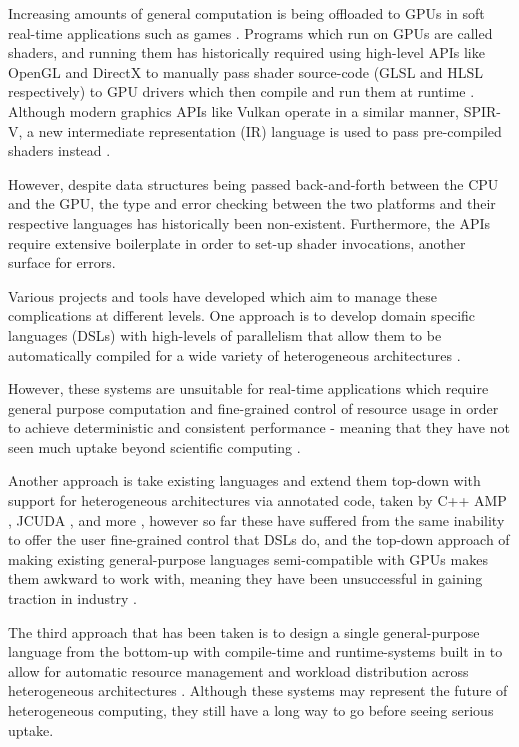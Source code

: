 \documentclass[11pt]{article}
\begin{document}
Increasing amounts of general computation is being offloaded to GPUs in soft
real-time applications such as games \cite{GPGPUTechniques2012}. Programs which
run on GPUs are called shaders, and running them has historically required
using high-level APIs like OpenGL and DirectX to manually pass shader
source-code (GLSL and HLSL respectively) to GPU drivers which then compile and
run them at runtime \cite{OpenGLWorkings} \cite{DirectXWorkings}. Although
modern graphics APIs like Vulkan \cite{Vulkan} operate in a similar manner,
SPIR-V, a new intermediate representation (IR) language is used to pass
pre-compiled shaders instead \cite{SPIR-V}.

However, despite data structures being passed back-and-forth between the CPU and
the GPU, the type and error checking between the two platforms and their
respective languages has historically been non-existent. Furthermore, the APIs
require extensive boilerplate in order to set-up shader invocations, another
surface for errors.

Various projects and tools have developed which aim to manage these
complications at different levels. One approach is to develop domain specific
languages (DSLs) with high-levels of parallelism that allow them to be
automatically compiled for a wide variety of heterogeneous architectures
\cite{DSL1} \cite{DSL2} \cite{Theano2016}.

However, these systems are unsuitable for real-time applications which require
general purpose computation and fine-grained control of resource usage in order
to achieve deterministic and consistent performance - meaning that they have not
seen much uptake beyond scientific computing \cite{Theano2016}.

Another approach is take existing languages and extend them top-down with
support for heterogeneous architectures via annotated code, taken by C++ AMP
\cite{CAMP}, JCUDA \cite{JCUDA2009}, and more \cite{SYCL} \cite{HCC}
\cite{Theano2016} \cite{CParallel}, however so far these have suffered from the
same inability to offer the user fine-grained control that DSLs do, and the
top-down approach of making existing general-purpose languages semi-compatible
with GPUs makes them awkward to work with, meaning they have been unsuccessful
in gaining traction in industry \cite{CAMPFail1} \cite{CAMPFail2}.

The third approach that has been taken is to design a single general-purpose
language from the bottom-up with compile-time and runtime-systems built in to
allow for automatic resource management and workload distribution across
heterogeneous architectures \cite{Lime2012} \cite{Lime2010}. Although these
systems may represent the future of heterogeneous computing, they still have a
long way to go before seeing serious uptake.
\end{document}
